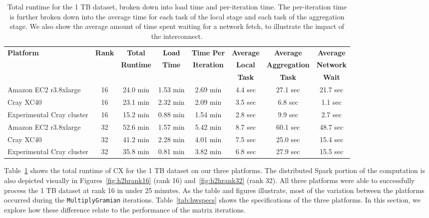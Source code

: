     \begin{table}
    \begin{center}
    \begin{tabular}{| l | c | c | c | c | c | c | c |}
    \toprule
    \textbf{Platform} & \textbf{Rank} & \textbf{Total} & \textbf{Load} & \textbf{Time Per} & \textbf{Average} & \textbf{Average} & \textbf{Average} \\
                               & & \textbf{Runtime} & \textbf{Time} & \textbf{Iteration} & \textbf{Local} & \textbf{Aggregation} & \textbf{Network} \\
                               & & & & & \textbf{Task} & \textbf{Task} & \textbf{Wait} \\
    \midrule
    Amazon EC2 r3.8xlarge & 16 & 24.0 min & 1.53 min & 2.69 min & 4.4 sec & 27.1 sec & 21.7 sec \\
    \midrule
    Cray XC40 & 16 & 23.1 min& 2.32 min & 2.09 min &  3.5 sec & 6.8 sec & 1.1 sec \\
    \midrule
    Experimental Cray cluster & 16 & 15.2 min & 0.88 min & 1.54 min &  2.8 sec & 9.9 sec & 2.7 sec \\
    \midrule
    Amazon EC2 r3.8xlarge & 32 & 52.6 min& 1.57 min & 5.42 min &  8.7 sec & 60.1 sec & 48.7 sec \\
    \midrule
    Cray XC40 & 32 & 41.2 min & 2.28 min & 4.01 min &  7.5 sec & 25.0 sec & 15.4 sec \\
    \midrule
   Experimental Cray cluster & 32 & 35.8 min & 0.81 min & 3.82 min &  6.8 sec & 27.9 sec & 15.5 sec \\
   \bottomrule
    \end{tabular}
    \end{center}
    \caption{Total runtime for the 1 TB dataset, broken down into load time and per-iteration time. The per-iteration time is further broken down into the average time for each task of the local stage and each task of the aggregation stage.  We also show the average amount of time spent waiting for a network fetch, to illustrate the impact of the interconnect.}
    \label{tab:h2hres1TB}
    \end{table}
    
Table~\ref{tab:h2hres1TB} shows the total runtime of CX for the 1 TB dataset on our three platforms.  The distributed Spark portion of the computation is also depicted visually in Figures~\ref{fig:h2hrank16} (rank 16) and~\ref{fig:h2hrank32} (rank 32).  All three platforms were able to successfully process the 1 TB dataset at rank 16 in under 25 minutes.  As the table and figures illustrate, most of the variation between the platforms occurred during the \texttt{MultiplyGramian} iterations.  Table~\ref{tab:hwspecs} shows the specifications of the three platforms. In this section, we explore how these difference relate to the performance of the matrix iterations.

